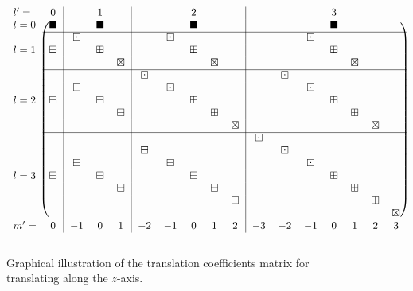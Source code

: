 \begin{figure}[h]
\[
    \begin{blockarray}{lc|ccc|ccccc|ccccccc}
    l' = & 0 & & 1 & & & & 2 & & & & & & 3 & & & \\
    \begin{block}{l(c|ccc|ccccc|ccccccc)}
    l = 0 & \blacksquare &  & \blacksquare &  &  &  & \blacksquare &  &  &  &  &  & \blacksquare &  &  &  \\ \cline{2-17}
     &  & \boxdot &  &  &  & \boxdot &  &  &  &  &  & \boxdot &  &  &  &  \\
    l = 1 & \boxminus &  & \boxplus &  &  &  & \boxplus &  &  &  &  &  & \boxplus &  &  &  \\
     &  &  &  & \boxtimes &  &  &  & \boxtimes &  &  &  &  &  & \boxtimes &  &  \\ \cline{2-17}
     &  &  &  &  & \boxdot &  &  &  &  &  & \boxdot &  &  &  &  &  \\
     &  & \boxminus &  &  &  & \boxdot &  &  &  &  &  & \boxdot &  &  &  &  \\
    l = 2 & \boxminus &  & \boxminus &  &  &  & \boxplus &  &  &  &  &  & \boxplus &  &  &  \\
     &  &  &  & \boxminus &  &  &  & \boxplus &  &  &  &  &  & \boxplus &  &  \\
     &  &  &  &  &  &  &  &  & \boxtimes &  &  &  &  &  & \boxtimes &  \\ \cline{2-17}
     &  &  &  &  &  &  &  &  &  & \boxdot &  &  &  &  &  &  \\
     &  &  &  &  & \boxminus &  &  &  &  &  & \boxdot &  &  &  &  &  \\
     &  & \boxminus &  &  &  & \boxminus &  &  &  &  &  & \boxdot &  &  &  &  \\
    l = 3 & \boxminus &  & \boxminus &  &  &  & \boxminus &  &  &  &  &  & \boxplus &  &  &  \\
     &  &  &  & \boxminus &  &  &  & \boxminus &  &  &  &  &  & \boxplus &  &  \\
     &  &  &  &  &  &  &  &  & \boxminus &  &  &  &  &  & \boxplus &  \\
     &  &  &  &  &  &  &  &  &  &  &  &  &  &  &  & \boxtimes \\
    \end{block}
    m' = & 0 & -1 & 0 & 1 & -2 & -1 & 0 & 1 & 2 & -3 & -2 & -1 & 0 & 1 & 2 & 3 \\
    \end{blockarray}
\]
\caption[Graphical illustration of the coaxial translation coefficients matrix.]{
Graphical illustration of the translation coefficients matrix for translating along the $z$-axis.}
\label{fig:A1_Navigation_Filters:z_Translation}
\end{figure}

